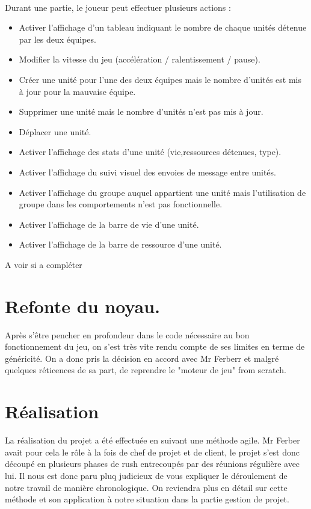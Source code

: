 \documentclass{report}
\begin{document}
\paragraph{}Durant une partie, le joueur peut effectuer plusieurs actions :
\begin{itemize}
\item Activer l'affichage d'un tableau indiquant le nombre de chaque unités détenue par les deux équipes.
\item Modifier la vitesse du jeu (accélération / ralentissement / pause).
\item Créer une unité pour l'une des deux équipes mais le nombre d'unités est mis à jour pour la mauvaise équipe.
\item Supprimer une unité mais le nombre d'unités n'est pas mis à jour.
\item Déplacer une unité.
\item Activer l'affichage des stats d'une unité (vie,ressources détenues, type).
\item Activer l'affichage du suivi visuel des envoies de message entre unités.
\item Activer l'affichage du groupe auquel appartient une unité mais l'utilisation de groupe dans les comportements n'est pas fonctionnelle.
\item Activer l'affichage de la barre de vie d'une unité.
\item Activer l'affichage de la barre de ressource d'une unité.
\end{itemize}

A voir si a compléter

\section{Refonte du noyau.}

Après s'être pencher en profondeur dans le code nécessaire au bon fonctionnement du jeu, on s'est très vite rendu compte de ses limites en terme de généricité.
On a donc pris la décision en accord avec Mr Ferberr et malgré quelques réticences de sa part, de reprendre le "moteur de jeu" from scratch.

\section{Réalisation}

La réalisation du projet a été effectuée en suivant une méthode agile. Mr Ferber avait pour cela le rôle à la fois de chef de projet et de client, le projet s'est donc découpé en plusieurs phases de rush entrecoupés par des réunions régulière avec lui. Il nous est donc paru pluq judicieux de vous expliquer le déroulement de notre travail de manière chronologique. On reviendra plus en détail sur cette méthode et son application à notre situation dans la partie gestion de projet. 
\end{document}
